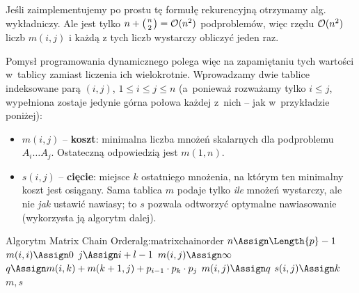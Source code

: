 Jeśli zaimplementujemy po prostu tę formułę rekurencyjną otrzymamy alg. wykładniczy. Ale jest tylko $n + \binom{n}{2} = \BO(n^2)$ podproblemów, więc rzędu $\mathcal{O}(n^2)$ liczb $m(i, j)$ i każdą z tych liczb wystarczy obliczyć jeden raz.

Pomysł programowania dynamicznego polega więc na zapamiętaniu tych wartości w~tablicy zamiast liczenia ich wielokrotnie. Wprowadzamy dwie tablice indeksowane parą $(i, j)$, $1 \leq i \leq j \leq n$ (a~ponieważ rozważamy tylko $i \leq j$, wypełniona zostaje jedynie górna połowa każdej z~nich -- jak w~przykładzie poniżej):
\begin{itemize}
	\item $m(i, j)$ -- \textbf{koszt}: minimalna liczba mnożeń skalarnych dla podproblemu $A_i \dots A_j$. Ostateczną odpowiedzią jest $m(1, n)$.
	\item $s(i, j)$ -- \textbf{cięcie}: miejsce $k$ ostatniego mnożenia, na którym ten minimalny koszt jest osiągany. Sama tablica $m$ podaje tylko \emph{ile} mnożeń wystarczy, ale nie \emph{jak} ustawić nawiasy; to $s$ pozwala odtworzyć optymalne nawiasowanie (wykorzysta ją algorytm  dalej).
\end{itemize}

\begin{alg}{Algorytm Matrix Chain Order}{alg:matrixchainorder}
	\State $n \Assign \Length{p} - 1$ 
	\State $m(i, i) \Assign 0$
	\EndFor
	 
	 
	\State $j \Assign i + l - 1$ 
	\State $m(i, j) \Assign \infty$ 
	\State $q \Assign m(i, k) + m(k + 1, j) + p_{i-1} \cdot p_k \cdot p_j$
	\State $m(i, j) \Assign q$
	\State $s(i, j) \Assign k$
	\EndIf
	\EndFor
	\EndFor
	\EndFor
	\State \Return $m, s$
	\EndFunction
\end{alg}


